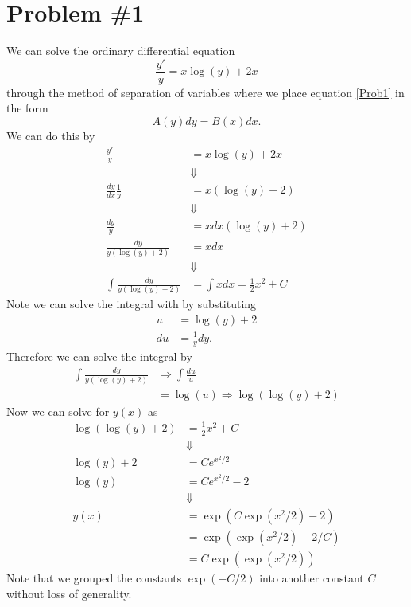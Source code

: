 \documentclass[11pt]{article}
\numberwithin{equation}{section}
\begin{document}


\section{Problem \#1}
We can solve the ordinary differential equation
\begin{equation}
\frac{y'}{y} = x\log(y) + 2x
\label{Prob1}
\end{equation}
through the method of separation of variables where we place equation \ref{Prob1} in the form
$$A(y)dy = B(x)dx.$$
We can do this by
\begin{align*}
\frac{y'}{y} &= x\log(y) + 2x\\
&\Downarrow\\
\frac{dy}{dx}\frac{1}{y} &= x(\log(y) + 2)\\
&\Downarrow\\
\frac{dy}{y} &= xdx(\log(y) + 2)\\
\frac{dy}{y(\log(y)+2)} &= xdx\\
&\Downarrow\\
\int\frac{dy}{y(\log(y)+2)} &= \int xdx = \frac{1}{2}x^2 + C
\end{align*}
Note we can solve the integral with by substituting
\begin{align*}
u &= \log(y) + 2\\
du &= \frac{1}{y}dy.
\end{align*}
Therefore we can solve the integral by
\begin{align*}
\int\frac{dy}{y(\log(y)+2)} &\Rightarrow \int\frac{du}{u}\\
&= \log(u) \Rightarrow \log(\log(y)+2)
\end{align*}
Now we can solve for $y(x)$ as
\begin{align*}
\log(\log(y)+2) &= \frac{1}{2}x^2+C\\
&\Downarrow\\
\log(y)+2 &= Ce^{x^2/2}\\
\log(y) &= Ce^{x^2/2}-2\\
&\Downarrow\\
y(x) &= \exp(C\exp(x^2/2)-2)\\
&= \exp(\exp(x^2/2)-2/C)\\
&= C\exp(\exp(x^2/2))
\end{align*}
Note that we grouped the constants $\exp(-C/2)$ into another constant $C$ without loss of 
generality.

\pagebreak
\end{document}
